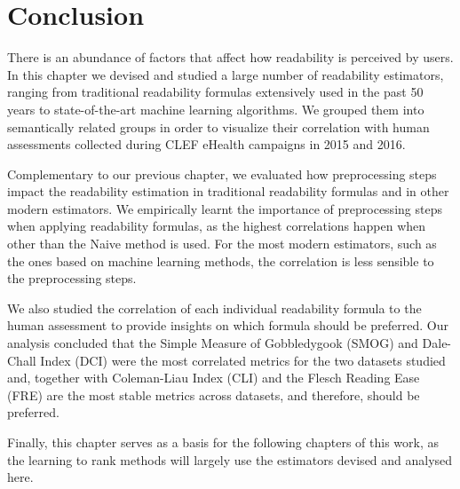 \documentclass[runningheads,a4paper]{llncs}
\newcommand{\mytodo}[1]{\textcolor{red}{#1}}
\begin{document}
\section{Conclusion}
\label{sec:conclusion_doc_analysis}

There is an abundance of factors that affect how readability is perceived by users. 
In this chapter we devised and studied a large number of readability estimators, ranging from traditional readability formulas extensively used in the past 50 years to state-of-the-art machine learning algorithms.
We grouped them into semantically related groups in order to visualize their correlation with human assessments collected during CLEF eHealth campaigns in 2015 and 2016.

Complementary to our previous chapter, we evaluated how preprocessing steps impact the readability estimation in traditional readability formulas and in other modern estimators. We empirically learnt the importance of preprocessing steps when applying readability formulas, as the highest correlations happen when other than the Naive method is used.
For the most modern estimators, such as the ones based on machine learning methods, the correlation is less sensible to the preprocessing steps.

We also studied the correlation of each individual readability formula to the human assessment to provide insights on which formula should be preferred. Our analysis concluded that the Simple Measure of Gobbledygook (SMOG) and Dale-Chall Index (DCI) were the most correlated metrics for the two datasets studied and, together with Coleman-Liau Index (CLI) and the Flesch Reading Ease (FRE) are the most stable metrics across datasets, and therefore, should be preferred.

Finally, this chapter serves as a basis for the following chapters of this work, as the learning to rank methods will largely use the estimators devised and analysed here.









\end{document}
